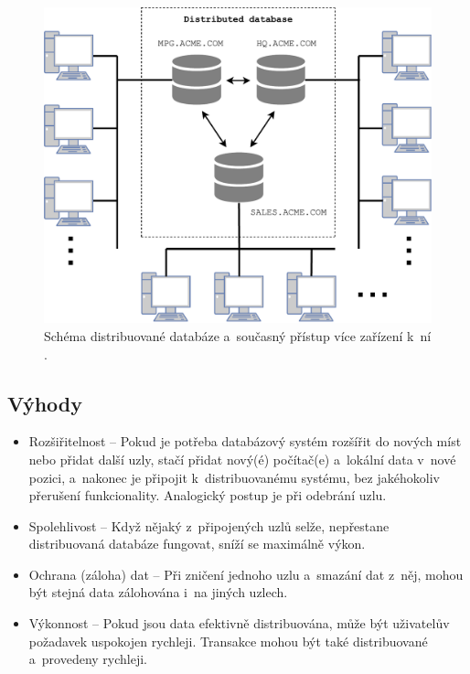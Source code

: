 \begin{figure}[!h]
  \centering
  \includegraphics[width=15cm]{template-fig/DistributedDatabase.pdf}
  \caption{Schéma distribuované databáze a~současný přístup více zařízení k~ní \cite{distributedDBMSPic}.}
  \label{FIG_DistrDB}
\end{figure}

\subsection{Výhody}
\begin{itemize}
\item Rozšiřitelnost -- Pokud je potřeba databázový systém rozšířit do nových míst nebo přidat další uzly, stačí přidat nový(é) počítač(e) a~lokální data v~nové pozici, a~nakonec je připojit k~distribuovanému systému, bez jakéhokoliv přerušení funkcionality. Analogický postup je při odebrání uzlu.

\item Spolehlivost -- Když nějaký z~připojených uzlů selže, nepřestane distribuovaná databáze fungovat, sníží se maximálně výkon.

\item Ochrana (záloha) dat -- Při zničení jednoho uzlu a~smazání dat z~něj, mohou být stejná data zálohována i~na jiných uzlech.

\item Výkonnost -- Pokud jsou data efektivně distribuována, může být uživatelův požadavek uspokojen rychleji. Transakce mohou být také distribuované a~provedeny rychleji. 
\end{itemize}

